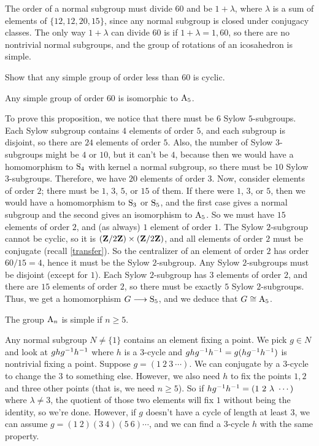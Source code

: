 \documentclass[11pt, oneside]{amsart}
\begin{document}
The order of a normal subgroup must divide $60$ and be $1 + \lambda$, where $\lambda$ is a sum of elements of $\{12,12,20,15\}$, since any normal subgroup is closed under conjugacy classes. The only way $1+\lambda$ can divide $60$ is if $1 + \lambda = 1, 60$, so there are no nontrivial normal subgroups, and the group of rotations of an icosahedron is simple.

\begin{exercise}
Show that any simple group of order less than $60$ is cyclic.
\end{exercise}

\begin{proposition}
Any simple group of order $60$ is isomorphic to $\operatorname{A}_5$.
\end{proposition}

To prove this proposition, we notice that there must be $6$ Sylow $5$-subgroups. Each Sylow subgroup contains $4$ elements of order $5$, and each subgroup is disjoint, so there are $24$ elements of order $5$. Also, the number of Sylow $3$-subgroups might be $4$ or $10$, but it can't be $4$, because then we would have a homomorphism to $\operatorname{S}_4$ with kernel a normal subgroup, so there must be $10$ Sylow $3$-subgroups. Therefore, we have $20$ elements of order $3$. Now, consider elements of order $2$; there must be $1$, $3$, $5$, or $15$ of them. If there were $1$, $3$, or $5$, then we would have a homomorphism to $\operatorname{S}_3$ or $\operatorname{S}_5$, and the first case gives a normal subgroup and the second gives an isomorphism to $\operatorname{A}_5$. So we must have $15$ elements of order $2$, and (as always) $1$ element of order $1$. The Sylow $2$-subgroup cannot be cyclic, so it is $(\mathbf Z / 2\mathbf Z)\times (\mathbf Z / 2\mathbf Z)$, and all elements of order $2$ must be conjugate (recall \cref{transfer}). So the centralizer of an element of order $2$ has order $60/15=4$, hence it must be the Sylow $2$-subgroup. Any Sylow $2$-subgroups must be disjoint (except for $1$). Each Sylow $2$-subgroup has $3$ elements of order $2$, and there are $15$ elements of order $2$, so there must be exactly $5$ Sylow $2$-subgroups. Thus, we get a homomorphism $G\longrightarrow \operatorname{S}_5$, and we deduce that $G\cong \operatorname{A}_5$. 

\begin{proposition}
The group $\operatorname{A}_n$ is simple if $n \ge 5$.
\end{proposition}

Any normal subgroup $N\ne \{1\}$ contains an element fixing a point. We pick $g\in N$ and look at $ghg^{-1} h^{-1}$ where $h$ is a $3$-cycle and $ghg^{-1} h^{-1} = g(hg^{-1} h^{-1})$ is nontrivial fixing a point. Suppose $g = (1\  2\ 3 \ \cdots)$. We can conjugate by a $3$-cycle to change the $3$ to something else. However, we also need $h$ to fix the points $1,2$ and three other points (that is, we need $n\ge 5$). So if $hg\inv h\inv = (1\ 2\ \lambda\ \cdots)$ where $\lambda\ne 3$, the quotient of those two elements will fix $1$ without being the identity, so we're done. However, if $g$ doesn't have a cycle of length at least $3$, we can assume $g= (1\ 2)(3\ 4)(5\ 6)\cdots$, and we can find a $3$-cycle $h$ with the same property. 
\end{document}
